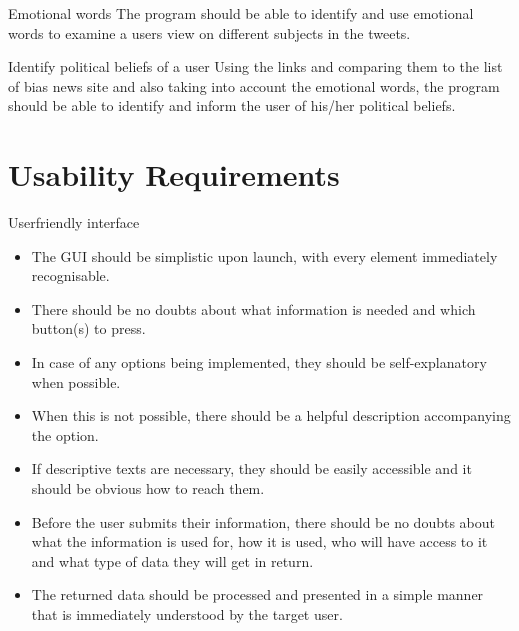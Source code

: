 \begin{requirement}{Emotional  words}
The program should be able to identify and use emotional words to examine a
users view on different subjects in the tweets. 
\end{requirement}

\begin{requirement}{Identify political beliefs of a user }
Using the links and comparing them to the list of bias news site and also taking
into account the emotional words, the program should be able to identify and
inform the user of his/her political beliefs. 
\end{requirement}



\section{Usability Requirements}
\begin{requirement}{Userfriendly interface} 
\begin{itemize}
  \item The \ac{GUI} should be simplistic upon launch, with every element immediately recognisable.
  \item There should be no doubts about what information is needed and which button(s) to press.
  \item In case of any options being implemented, they should be self-explanatory when possible.
  \item When this is not possible, there should be a helpful description
  accompanying the option.
  \item If descriptive texts are necessary, they should be easily accessible and
  it should be obvious how to reach them.
  \item Before the user submits their information, there should be no doubts
  about what the information is used for, how it is used, who will have access to it and what type of data they will get in return.
  \item The returned data should be processed and presented in a simple manner that is immediately understood by the
        target user.
\end{itemize}
\end{requirement}